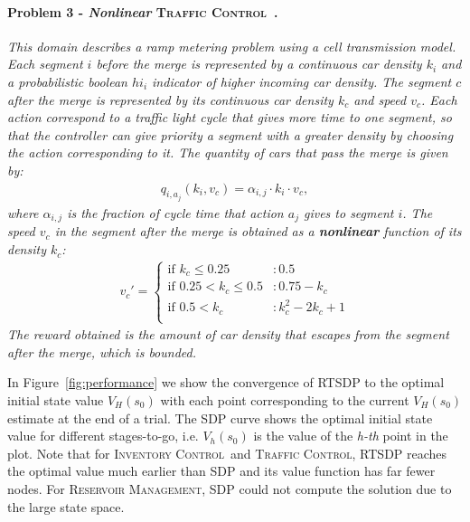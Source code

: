 \documentclass[letterpaper]{article}
\newcommand{\Invent}{\textsc{Inventory Control}}
\newcommand{\Traffic}{\textsc{Traffic Control}}
\newcommand{\Reservoir}{\textsc{Reservoir Management}}
\begin{document}
\paragraph{\bf Problem 3 - \emph{Nonlinear} \Traffic~\cite{daganzo1994cell}. \label{ex3}}
\textit{This domain describes a ramp metering problem using a cell transmission model. Each segment $i$ before the merge is represented by a continuous car density $k_i$ and a probabilistic boolean $hi_i $ indicator of higher incoming car density. The segment $c$ after the merge is represented by its continuous car density $k_c$ and speed $v_c$.
Each action correspond to a traffic light cycle that gives more time to one segment, so that the controller can give priority a segment with a greater density by choosing the action corresponding to it. The quantity of cars that pass the merge is given by:
\begin{align*}
q_{i,a_j} (k_i, v_c) = \alpha_{i,j} \cdot k_i \cdot v_c,
\end{align*} 
where $\alpha_{i,j}$ is the fraction of cycle time that action $a_j$ gives to segment $i$.
The speed $v_c$ in the segment after the merge is obtained as a {\bf nonlinear} function of its density $k_c$:
{\small
\begin{align*}
v_c' =
\begin{cases}
  \text{if }  k_c \leq 0.25 & : 0.5\\ 
  \text{if }  0.25 < k_c \leq 0.5 &:  0.75 - k_c\\ 
  \text{if }  0.5 < k_c &: k_c^2 - 2k_c +1\\ 
\end{cases}
\end{align*}
}
The reward obtained is the amount of car density that escapes from the segment after the merge, which is bounded.
}

In Figure~\ref{fig:performance} we show the convergence of RTSDP to the optimal initial state value $V_H(s_0)$ with each point corresponding to the current $V_H(s_0)$ estimate at the end of a trial.
The SDP curve shows the optimal initial state value for different stages-to-go, i.e. $V_h(s_0)$ is the value of the {\it h-th} point in the plot. 
Note that for \Invent~and \Traffic, RTSDP reaches the optimal value much earlier than SDP and its value function has far fewer nodes. For \Reservoir, SDP could not compute the solution due to the large state space.
\end{document}

